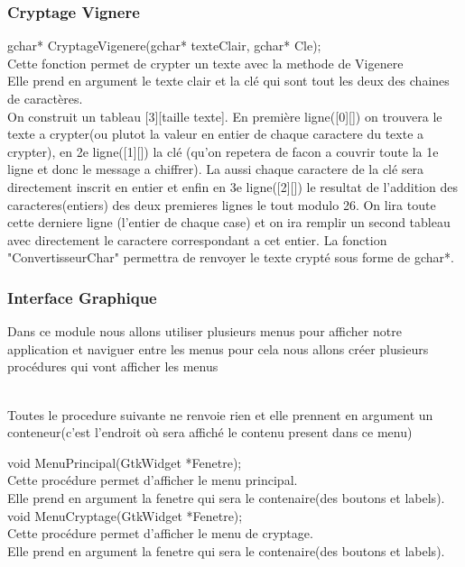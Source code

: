 \documentclass[a4]{article}
\begin{document}
		\subsubsection{Cryptage Vignere}
	gchar* CryptageVigenere(gchar* texteClair, gchar* Cle);\\
		Cette fonction permet de crypter un texte avec la methode de Vigenere\\
		Elle prend en argument le texte clair et la clé qui sont tout les deux des chaines de caractères.\\
		On construit un tableau [3][taille texte]. En première ligne([0][]) on trouvera le texte a crypter(ou plutot la valeur en entier de chaque caractere du texte a crypter), 
		en 2e ligne([1][]) la clé (qu'on repetera de facon a couvrir toute la 1e ligne et donc le message a chiffrer). La aussi chaque caractere de la clé sera directement inscrit en entier et enfin en 3e ligne([2][]) le resultat de l'addition des caracteres(entiers) des deux premieres lignes le tout modulo 26.
		On lira toute cette derniere ligne (l'entier de chaque case) et on ira remplir un second tableau avec directement le caractere correspondant a cet entier.
		La fonction "ConvertisseurChar" permettra de renvoyer le texte crypté sous forme de gchar*.
		
		\subsubsection{Interface Graphique}
		Dans ce module nous allons utiliser plusieurs menus pour afficher notre application et naviguer 
		entre les menus pour cela nous allons créer plusieurs procédures qui vont afficher les menus  
		
		\\
		
		Toutes le procedure suivante ne renvoie rien et elle prennent en argument un conteneur(c'est l'endroit où sera affiché le contenu present dans ce menu)
		
	void MenuPrincipal(GtkWidget *Fenetre);\\
		Cette procédure permet d'afficher le menu principal.\\
		Elle prend en argument la fenetre qui sera le contenaire(des boutons et labels).\\
	
	void MenuCryptage(GtkWidget *Fenetre);\\
		Cette procédure permet d'afficher le menu de cryptage.\\
		Elle prend en argument la fenetre qui sera le contenaire(des boutons et labels).\\
\end{document}
